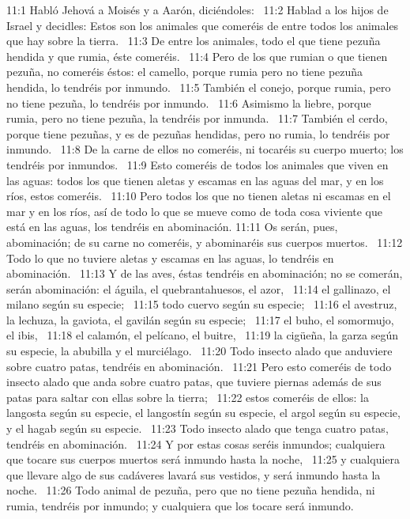 11:1 Habló Jehová a Moisés y a Aarón, diciéndoles:  
11:2 Hablad a los hijos de Israel y decidles: Estos son los animales que comeréis de entre todos los animales que hay sobre la tierra.  
11:3 De entre los animales, todo el que tiene pezuña hendida y que rumia, éste comeréis.  
11:4 Pero de los que rumian o que tienen pezuña, no comeréis éstos: el camello, porque rumia pero no tiene pezuña hendida, lo tendréis por inmundo.  
11:5 También el conejo, porque rumia, pero no tiene pezuña, lo tendréis por inmundo.  
11:6 Asimismo la liebre, porque rumia, pero no tiene pezuña, la tendréis por inmunda.  
11:7 También el cerdo, porque tiene pezuñas, y es de pezuñas hendidas, pero no rumia, lo tendréis por inmundo.  
11:8 De la carne de ellos no comeréis, ni tocaréis su cuerpo muerto; los tendréis por inmundos.  
11:9 Esto comeréis de todos los animales que viven en las aguas: todos los que tienen aletas y escamas en las aguas del mar, y en los ríos, estos comeréis.  
11:10 Pero todos los que no tienen aletas ni escamas en el mar y en los ríos, así de todo lo que se mueve como de toda cosa viviente que está en las aguas, los tendréis en abominación. 
11:11 Os serán, pues, abominación; de su carne no comeréis, y abominaréis sus cuerpos muertos.  
11:12 Todo lo que no tuviere aletas y escamas en las aguas, lo tendréis en abominación.  
11:13 Y de las aves, éstas tendréis en abominación; no se comerán, serán abominación: el águila, el quebrantahuesos, el azor,  
11:14 el gallinazo, el milano según su especie;  
11:15 todo cuervo según su especie;  
11:16 el avestruz, la lechuza, la gaviota, el gavilán según su especie;  
11:17 el buho, el somormujo, el ibis,  
11:18 el calamón, el pelícano, el buitre,  
11:19 la cigüeña, la garza según su especie, la abubilla y el murciélago.  
11:20 Todo insecto alado que anduviere sobre cuatro patas, tendréis en abominación.  
11:21 Pero esto comeréis de todo insecto alado que anda sobre cuatro patas, que tuviere piernas además de sus patas para saltar con ellas sobre la tierra;  
11:22 estos comeréis de ellos: la langosta según su especie, el langostín según su especie, el argol según su especie, y el hagab según su especie.  
11:23 Todo insecto alado que tenga cuatro patas, tendréis en abominación.  
11:24 Y por estas cosas seréis inmundos; cualquiera que tocare sus cuerpos muertos será inmundo hasta la noche,  
11:25 y cualquiera que llevare algo de sus cadáveres lavará sus vestidos, y será inmundo hasta la noche.  
11:26 Todo animal de pezuña, pero que no tiene pezuña hendida, ni rumia, tendréis por inmundo; y cualquiera que los tocare será inmundo.  
